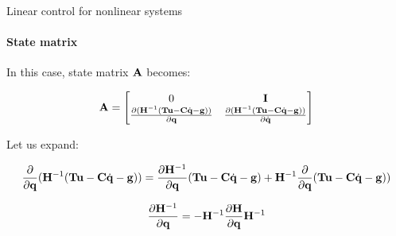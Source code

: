 \documentclass{beamer}
\begin{document}
\begin{frame}{Linear control for nonlinear systems}
\framesubtitle{State matrix}
\begin{flushleft}

In this case, state matrix $\mathbf{A}$ becomes:

\begin{equation}
    \mathbf{A} = 
    \begin{bmatrix}
    0 & \mathbf{I} \\
    \frac{\partial (\mathbf{H}^{-1} (\mathbf{T}\mathbf{u} -  \mathbf{C} \dot{\mathbf{q}} - \mathbf{g}) )}{\partial \mathbf{q}} 
    &
    \frac{\partial (\mathbf{H}^{-1} (\mathbf{T}\mathbf{u} -  \mathbf{C} \dot{\mathbf{q}} - \mathbf{g}) )}{\partial \dot{\mathbf{q}}}
    \end{bmatrix}
\end{equation}

Let us expand:

\begin{equation}
    \frac{\partial }{\partial \mathbf{q}} (\mathbf{H}^{-1} (\mathbf{T}\mathbf{u} -  \mathbf{C} \dot{\mathbf{q}} - \mathbf{g}) ) 
    = 
    \frac{\partial \mathbf{H}^{-1}}{\partial \mathbf{q}} (\mathbf{T}\mathbf{u} -  \mathbf{C} \dot{\mathbf{q}} - \mathbf{g})
    + 
    \mathbf{H}^{-1} 
    \frac{\partial }{\partial \mathbf{q}} 
    (\mathbf{T}\mathbf{u} -  \mathbf{C} \dot{\mathbf{q}} - \mathbf{g}) )
\end{equation}

\begin{equation}
    \frac{\partial \mathbf{H}^{-1}}{\partial \mathbf{q}} = 
    - \mathbf{H}^{-1} \frac{\partial \mathbf{H}}{\partial \mathbf{q}} 
    \mathbf{H}^{-1}
\end{equation}

\end{flushleft}
\end{frame}
\end{document}
